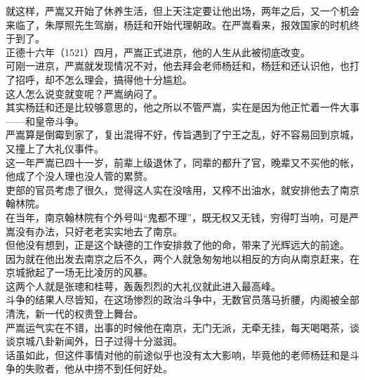 \begin{multicols}{\theparacolNo}
就这样，严嵩又开始了休养生活，但上天注定要让他出场，两年之后，又一个机会来临了，朱厚照先生驾崩，杨廷和开始代理朝政。在严嵩看来，报效国家的时机终于到了。\\

正德十六年（1521）四月，严嵩正式进京，他的人生从此被彻底改变。\\

可刚一进京，严嵩就发现情况不对，他去拜会老师杨廷和，杨廷和还认识他，也打了招呼，却不怎么理会，搞得他十分尴尬。\\

这人怎么说变就变呢？严嵩纳闷了。\\

其实杨廷和还是比较够意思的，他之所以不管严嵩，实在是因为他正忙着一件大事——和皇帝斗争。\\

严嵩算是倒霉到家了，复出混得不好，传旨遇到了宁王之乱，好不容易回到京城，又撞上了大礼仪事件。\\

这一年严嵩已四十一岁，前辈上级退休了，同辈的都升了官，晚辈又不买他的帐，他成了个没人理也没人管的累赘。\\

吏部的官员考虑了很久，觉得这人实在没啥用，又榨不出油水，就安排他去了南京翰林院。\\

在当年，南京翰林院有个外号叫“鬼都不理”，既无权又无钱，穷得叮当响，可是严嵩没有办法，只好老老实实地去了南京。\\

但他没有想到，正是这个缺德的工作安排救了他的命，带来了光辉远大的前途。\\

因为就在他出发去南京之后不久，两个人就急匆匆地以相反的方向从南京赶来，在京城掀起了一场无比凌厉的风暴。\\

这两个人就是张璁和桂萼，轰轰烈烈的大礼仪就此进入最高峰。\\

斗争的结果人尽皆知，在这场惨烈的政治斗争中，无数官员落马折腰，内阁被全部清洗，新一代的权贵登上舞台。\\

严嵩运气实在不错，出事的时候他在南京，无门无派，无牵无挂，每天喝喝茶，谈谈京城八卦新闻外，日子过得十分滋润。\\

话虽如此，但这件事情对他的前途似乎也没有太大影响，毕竟他的老师杨廷和是斗争的失败者，他从中捞不到任何好处。\\


\end{multicols}
